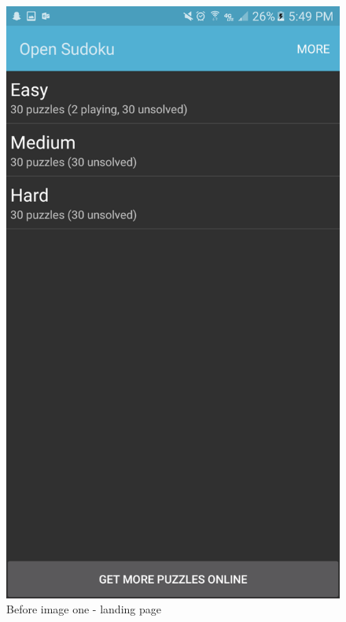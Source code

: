 \documentclass[10pt]{article}
\begin{document}
\begin{figure}
\includegraphics[width=\linewidth]{img/before1.png}
\caption{Before image one - landing page}
\end{figure}
\end{document}

